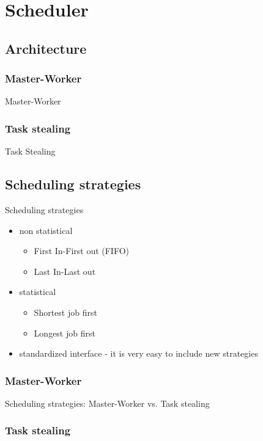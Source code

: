 \section{Scheduler}
\subsection{Architecture}

\subsubsection{Master-Worker}
	\begin{frame}{Master-Worker}
		
	\end{frame}
\subsubsection{Task stealing}
	\begin{frame}{Task Stealing}
	\end{frame}
\subsection{Scheduling strategies}

	\begin{frame}{Scheduling strategies}
		\begin{itemize}
		\item non statistical
		\begin{itemize}
			\item First In-First out (FIFO)
			\item Last In-Last out
		\end{itemize}
		\item statistical
		\begin{itemize}
			\item Shortest job first
			\item Longest job first
		\end{itemize}
		\item standardized interface - it is very easy to include new strategies
		\end{itemize}
	\end{frame}
\subsubsection{Master-Worker}
	\begin{frame}{Scheduling strategies: Master-Worker vs. Task stealing}
	\end{frame}
\subsubsection{Task stealing}
	\begin{frame}
	\end{frame}
